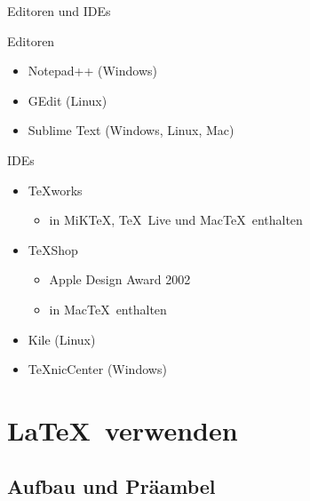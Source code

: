 \begin{Frame}{Editoren und IDEs}
  \begin{Block}{Editoren}
    \begin{itemize}
      \item Notepad++ (Windows)
      \item GEdit (Linux)
      \item Sublime Text (Windows, Linux, Mac)
    \end{itemize}
  \end{Block}

  \pause

  \begin{Block}{IDEs}
    \begin{itemize}
      \item \TeX works
        \begin{itemize}
          \item in MiK\TeX, \TeX\ Live und Mac\TeX\ enthalten
        \end{itemize}
      \item \TeX Shop
        \begin{itemize}
          \item Apple Design Award 2002
          \item in Mac\TeX\ enthalten
        \end{itemize}
      \item Kile (Linux)
      \item \TeX nicCenter (Windows)
    \end{itemize}
  \end{Block}
\end{Frame}

\section{\LaTeX\ verwenden}

\subsection{Aufbau und Präambel}

